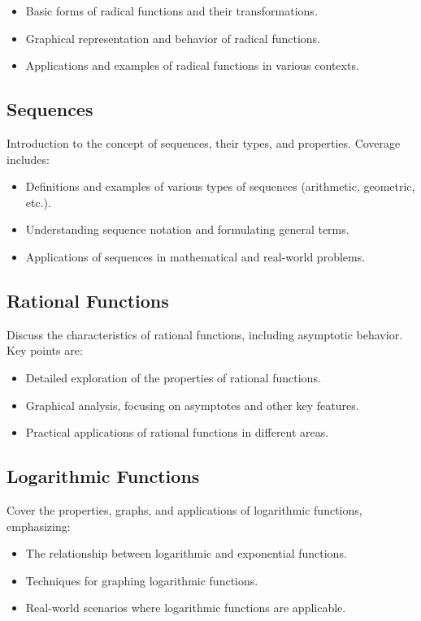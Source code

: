 \documentclass[a4paper,12pt]{book}
\newcounter{problem}
\begin{document}
\begin{itemize}
    \item Basic forms of radical functions and their transformations.
    \item Graphical representation and behavior of radical functions.
    \item Applications and examples of radical functions in various contexts.
\end{itemize}


\subsection{Sequences}
\label{subsec:sequences}
Introduction to the concept of sequences, their types, and properties. Coverage includes:


\begin{itemize}
    \item Definitions and examples of various types of sequences (arithmetic, geometric, etc.).
    \item Understanding sequence notation and formulating general terms.
    \item Applications of sequences in mathematical and real-world problems.
\end{itemize}


\subsection{Rational Functions}
\label{subsec:rational_functions_chapter}
Discuss the characteristics of rational functions, including asymptotic behavior. Key points are:


\begin{itemize}
    \item Detailed exploration of the properties of rational functions.
    \item Graphical analysis, focusing on asymptotes and other key features.
    \item Practical applications of rational functions in different areas.
\end{itemize}


\subsection{Logarithmic Functions}
\label{subsec:logarithmic_functions}
Cover the properties, graphs, and applications of logarithmic functions, emphasizing:


\begin{itemize}
    \item The relationship between logarithmic and exponential functions.
    \item Techniques for graphing logarithmic functions.
    \item Real-world scenarios where logarithmic functions are applicable.
\end{itemize}
\end{document}
